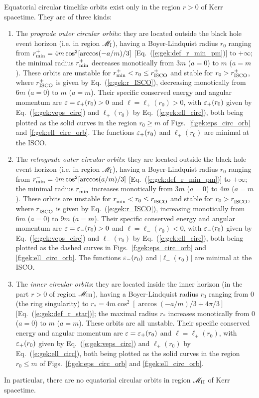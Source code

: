 \begin{greybox}
Equatorial circular timelike orbits exist only in the region $r>0$ of Kerr spacetime.
They are of three kinds:
\begin{enumerate}
\item The \emph{prograde outer circular orbits}: they are located outside
the black hole event horizon (i.e. in region $\mathscr{M}_{\rm I}$), having a Boyer-Lindquist radius $r_0$ ranging
from  $r_{\rm min}^+ = 4 m \cos^2[\arccos(-a/m)/3]$
[Eq.~(\ref{e:gek:def_r_min_pm})] to $+\infty$;
the minimal radius
$r_{\rm min}^+$ decreases monotically from $3m$ ($a=0$) to $m$ ($a=m$).
These orbits are unstable for
$r_{\rm min}^+ < r_0 \leq r_{\rm ISCO}^+$ and stable for $r_0 > r_{\rm ISCO}^+$,
where $r_{\rm ISCO}^+$ is given by Eq.~(\ref{e:gek:r_ISCO}),
decreasing monotically from $6m$ ($a=0$) to $m$ ($a=m$).
Their specific conserved energy and angular momentum
are $\varepsilon = \varepsilon_+(r_0) >  0$ and $\ell = \ell_+(r_0) > 0$, with
$\varepsilon_+(r_0)$ given by Eq.~(\ref{e:gek:veps_circ}) and $\ell_+(r_0)$ by
Eq.~(\ref{e:gek:ell_circ}), both being plotted as the solid
curves in the region $r_0 \geq m$ of Figs.~\ref{f:gek:eps_circ_orb} and \ref{f:gek:ell_circ_orb}.
The functions $\varepsilon_+(r_0)$ and $\ell_+(r_0)$ are minimal at the ISCO.
\item The \emph{retrograde outer circular orbits}: they are located outside
the black hole event horizon (i.e. in region $\mathscr{M}_{\rm I}$), having a Boyer-Lindquist radius $r_0$ ranging
from $r_{\rm min}^- = 4 m \cos^2[\arccos(a/m)/3]$
[Eq.~(\ref{e:gek:def_r_min_pm})] to $+\infty$; the minimal radius
$r_{\rm min}^-$ increases monotically from $3m$ ($a=0$) to $4m$ ($a=m$).
These orbits are unstable for
$r_{\rm min}^- < r_0 \leq r_{\rm ISCO}^-$ and stable for $r_0 > r_{\rm ISCO}^-$,
where $r_{\rm ISCO}^-$ is given by Eq.~(\ref{e:gek:r_ISCO}),
increasing monotically from $6m$ ($a=0$) to $9m$ ($a=m$).
Their specific conserved energy and angular momentum
are $\varepsilon = \varepsilon_-(r_0) > 0$ and $\ell = \ell_-(r_0) < 0$, with
$\varepsilon_-(r_0)$ given by Eq.~(\ref{e:gek:veps_circ}) and $\ell_-(r_0)$ by
Eq.~(\ref{e:gek:ell_circ}), both being plotted as the dashed
curves in Figs.~\ref{f:gek:eps_circ_orb} and \ref{f:gek:ell_circ_orb}.
The functions $\varepsilon_-(r_0)$ and $|\ell_-(r_0)|$ are minimal at the ISCO.
\item The \emph{inner circular orbits}: they are located inside the inner horizon
(in the part $r>0$ of region $\mathscr{M}_{\rm III}$),
having a Boyer-Lindquist radius $r_0$ ranging
from $0$ (the ring singularity) to
$r_* = 4 m \cos^2[\arccos(-a/m)/3 + 4\pi/3]$
[Eq.~(\ref{e:gek:def_r_star})];
the maximal radius $r_*$ increases monotically from $0$ ($a=0$) to $m$ ($a=m$).
These orbits are all unstable. Their specific conserved energy and angular momentum
are $\varepsilon = \varepsilon_+(r_0)$ and $\ell = \ell_+(r_0)$, with
$\varepsilon_+(r_0)$ given by Eq.~(\ref{e:gek:veps_circ}) and $\ell_+(r_0)$ by
Eq.~(\ref{e:gek:ell_circ}), both being plotted as the solid
curves in the region $r_0 \leq m$ of Figs.~\ref{f:gek:eps_circ_orb} and \ref{f:gek:ell_circ_orb}.
\end{enumerate}
In particular, there are no equatorial circular orbits in region $\mathscr{M}_{\rm II}$ of Kerr spacetime.
\end{greybox}


